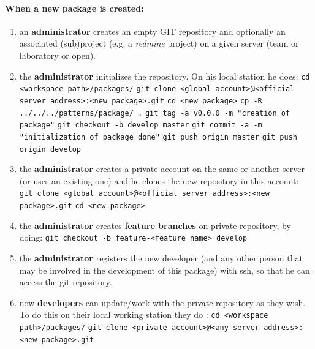 \documentclass[12pt,a4paper]{article}
\begin{document}
\paragraph{When a new package is created:}
\begin{enumerate}
\item an \textbf{administrator} creates an empty GIT repository and optionally an associated (sub)project (e.g. a \textit{redmine} project) on a given server (team or laboratory or open).
\item the \textbf{administrator} initializes the repository. On his local station he does:
\linebreak \verb|cd <workspace path>/packages/|
\linebreak \verb|git clone <global account>@<official server address>:<new package>.git|
\linebreak \verb|cd <new package>|
\linebreak \verb|cp -R ../../../patterns/package/ .|
\linebreak \verb|git tag -a v0.0.0 -m "creation of package"|
\linebreak \verb|git checkout -b develop master|
\linebreak \verb|git commit -a -m "initialization of package done"|
\linebreak \verb|git push origin master|
\linebreak \verb|git push origin develop|
\item the \textbf{administrator} creates a private account on the same or another server (or uses an existing one) and he clones the new repository in this account:
\linebreak \verb|git clone <global account>@<official server address>:<new package>.git|
\linebreak \verb|cd <new package>|
\item the \textbf{administrator} creates \textbf{feature branches} on private repository, by doing:
\linebreak \verb|git checkout -b feature-<feature name> develop|
\item the \textbf{administrator} registers the new developer (and any other person that may be involved in the development of this package) with ssh, so that he can access the git repository.
\item now \textbf{developers} can update/work with the private repository as they wish. To do this on their local working station they do :
\linebreak \verb|cd <workspace path>/packages/|
\linebreak \verb|git clone <private account>@<any server address>:<new package>.git|
\end{enumerate}
\end{document}
